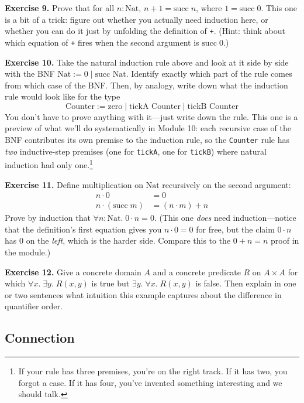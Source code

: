 \documentclass[11pt]{article}
\begin{document}
\textbf{Exercise 9.}\label{ex:m4:9} Prove that for all $n : \text{Nat}$, $n + 1 = \text{succ}\; n$, where $1 = \text{succ}\; 0$. This one is a bit of a trick: figure out whether you actually need induction here, or whether you can do it just by unfolding the definition of \texttt{+}. (Hint: think about which equation of \texttt{+} fires when the second argument is $\text{succ}\; 0$.)

\bigskip
\textbf{Exercise 10.}\label{ex:m4:10} Take the natural induction rule above and look at it side by side with the BNF $\text{Nat} := 0 \mid \text{succ Nat}$. Identify exactly which part of the rule comes from which case of the BNF. Then, by analogy, write down what the induction rule would look like for the type
\[
  \text{Counter} := \text{zero} \mid \text{tickA Counter} \mid \text{tickB Counter}
\]
You don't have to prove anything with it---just write down the rule. This one is a preview of what we'll do systematically in Module 10: each recursive case of the BNF contributes its own premise to the induction rule, so the \texttt{Counter} rule has \emph{two} inductive-step premises (one for \texttt{tickA}, one for \texttt{tickB}) where natural induction had only one.\footnote{If your rule has three premises, you're on the right track. If it has two, you forgot a case. If it has four, you've invented something interesting and we should talk.}

\bigskip
\textbf{Exercise 11.}\label{ex:m4:11} Define multiplication on $\text{Nat}$ recursively on the second argument:
\begin{align*}
  n \cdot 0 &= 0 \\
  n \cdot (\text{succ}\; m) &= (n \cdot m) + n
\end{align*}
Prove by induction that $\forall n : \text{Nat}.\; 0 \cdot n = 0$. (This one \emph{does} need induction---notice that the definition's first equation gives you $n \cdot 0 = 0$ for free, but the claim $0 \cdot n$ has $0$ on the \emph{left}, which is the harder side. Compare this to the $0 + n = n$ proof in the module.)

\bigskip
\textbf{Exercise 12.}\label{ex:m4:12} Give a concrete domain $A$ and a concrete predicate $R$ on $A \times A$ for which $\forall x.\; \exists y.\; R(x, y)$ is true but $\exists y.\; \forall x.\; R(x, y)$ is false. Then explain in one or two sentences what intuition this example captures about the difference in quantifier order.

\subsection*{Connection}
\end{document}
